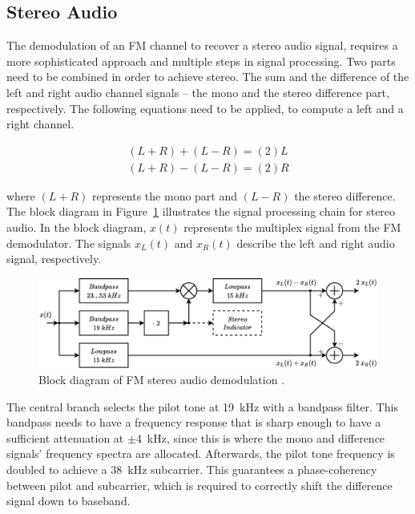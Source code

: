 \subsection{Stereo Audio}

The demodulation of an FM channel to recover a stereo audio signal, requires a more sophisticated approach and multiple steps in signal processing.
Two parts need to be combined in order to achieve stereo.
The sum and the difference of the left and right audio channel signals -- the mono and the stereo difference part, respectively.
The following equations need to be applied, to compute a left and a right channel.

\begin{equation}
  \begin{split}
    (L+R) + (L-R) = (2)L \\
    (L+R) - (L-R) = (2)R
    \label{equ_stereo_from_sum_diff}
  \end{split}
\end{equation}

\noindent
where $(L+R)$ represents the mono part and $(L-R)$ the stereo difference.\\

The block diagram in Figure~\ref{fig_bd_stereo_demod} illustrates the signal processing chain for stereo audio.
In the block diagram, $x(t)$ represents the multiplex signal from the FM demodulator.
The signals $x_L(t)$ and $x_R(t)$ describe the left and right audio signal, respectively.\\

\begin{figure}[!h]
  \centering
    \includegraphics[width=1.0\textwidth]{img/draw.io/bd_fm_demod_stereo_audio}
  \caption{Block diagram of FM stereo audio demodulation \cite{RoppelBegleitmaterial}.}
  \label{fig_bd_stereo_demod}
\end{figure}

The central branch selects the pilot tone at 19~kHz with a bandpass filter.
This bandpass needs to have a frequency response that is sharp enough to have a sufficient attenuation at $\pm$4~kHz, since this is where the mono and difference signals' frequency spectra are allocated.
Afterwards, the pilot tone frequency is doubled to achieve a 38~kHz subcarrier.
This guarantees a phase-coherency between pilot and subcarrier, which is required to correctly shift the difference signal down to baseband.\\

